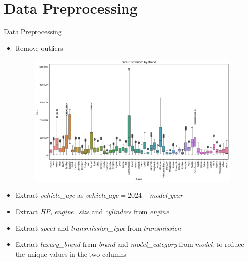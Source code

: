 \documentclass{beamer}
\begin{document}
\section{Data Preprocessing}
\begin{frame}{Data Preprocessing}
    \begin{itemize}
        \item Remove outliers
        \begin{figure}
            \centering
            \includegraphics[width=0.5\linewidth]{images/remove_outliers_boxplot_price_by_brand.png}
            \label{fig:enter-label}
        \end{figure}
        \item Extract \textit{vehicle\_age} as \(vehicle\_age = 2024 - model\_year\)
        \item Extract \textit{HP, engine\_size} and \textit{cylinders} from \textit{engine}
        \item Extract \textit{speed} and \textit{transmission\_type} from \textit{transmission}
        \item Extract \textit{luxury\_brand} from \textit{brand} and \textit{model\_category} from \textit{model}, to reduce the unique values in the two columns
    \end{itemize}
\end{frame}
\end{document}
